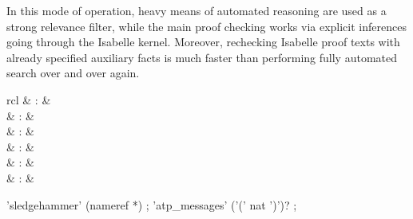 \begin{isabellebody}
\begin{isamarkuptext}
  In this mode of operation, heavy means of automated reasoning are
  used as a strong relevance filter, while the main proof checking
  works via explicit inferences going through the Isabelle kernel.
  Moreover, rechecking Isabelle proof texts with already specified
  auxiliary facts is much faster than performing fully automated
  search over and over again.

  \begin{matharray}{rcl}
    \hypertarget{command.HOL.sledgehammer}{\hyperlink{command.HOL.sledgehammer}{\mbox{}}}\isa{{\isachardoublequote}\isactrlsup {\isacharasterisk}{\isachardoublequote}} & : &  \\
    \hypertarget{command.HOL.print-atps}{\hyperlink{command.HOL.print-atps}{\mbox{}}}\isa{{\isachardoublequote}\isactrlsup {\isacharasterisk}{\isachardoublequote}} & : &  \\
    \hypertarget{command.HOL.atp-info}{\hyperlink{command.HOL.atp-info}{\mbox{}}}\isa{{\isachardoublequote}\isactrlsup {\isacharasterisk}{\isachardoublequote}} & : &  \\
    \hypertarget{command.HOL.atp-kill}{\hyperlink{command.HOL.atp-kill}{\mbox{}}}\isa{{\isachardoublequote}\isactrlsup {\isacharasterisk}{\isachardoublequote}} & : &  \\
    \hypertarget{command.HOL.atp-messages}{\hyperlink{command.HOL.atp-messages}{\mbox{}}}\isa{{\isachardoublequote}\isactrlsup {\isacharasterisk}{\isachardoublequote}} & : &  \\
    \hypertarget{method.HOL.metis}{\hyperlink{method.HOL.metis}{\mbox{}}} & : &  \\
  \end{matharray}

  \begin{rail}
  'sledgehammer' (nameref *)
  ;
  'atp\_messages' ('(' nat ')')?
  ;


\end{rail}
\end{isamarkuptext}
\end{isabellebody}
